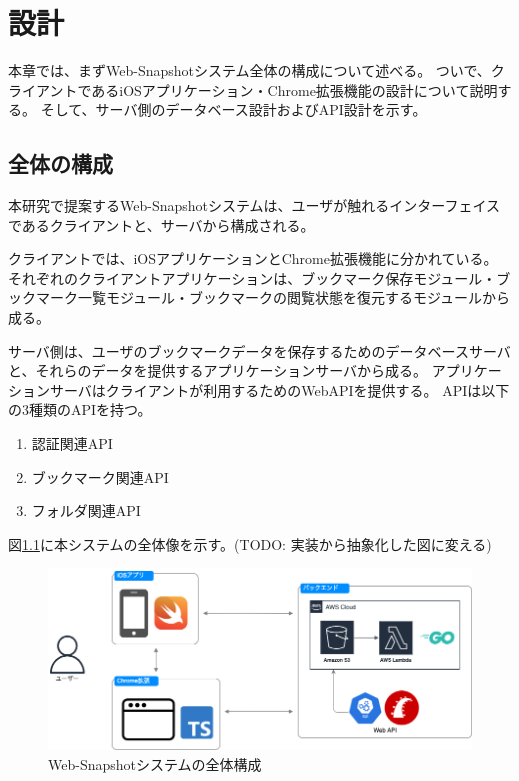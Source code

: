 \chapter{設計}
\label{chap:design}
本章では、まずWeb-Snapshotシステム全体の構成について述べる。
ついで、クライアントであるiOSアプリケーション・Chrome拡張機能の設計について説明する。
そして、サーバ側のデータベース設計およびAPI設計を示す。

\section{全体の構成}
本研究で提案するWeb-Snapshotシステムは、ユーザが触れるインターフェイスであるクライアントと、サーバから構成される。

クライアントでは、iOSアプリケーションとChrome拡張機能に分かれている。
それぞれのクライアントアプリケーションは、ブックマーク保存モジュール・ブックマーク一覧モジュール・ブックマークの閲覧状態を復元するモジュールから成る。

サーバ側は、ユーザのブックマークデータを保存するためのデータベースサーバと、それらのデータを提供するアプリケーションサーバから成る。
アプリケーションサーバはクライアントが利用するためのWebAPIを提供する。
APIは以下の3種類のAPIを持つ。
\begin{enumerate}
   \item 認証関連API
   \item ブックマーク関連API
   \item フォルダ関連API
\end{enumerate}

図\ref{fig:design-system-overall}に本システムの全体像を示す。(TODO: 実装から抽象化した図に変える)
\begin{figure}[htbp]
  \caption{Web-Snapshotシステムの全体構成}
  \label{fig:design-system-overall}
  \begin{center}
    \includegraphics[bb=0 0 915 667,width=15cm]{img/design-system-overall.pdf}
  \end{center}
\end{figure}

